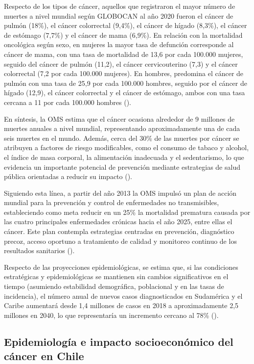 Respecto de los tipos de cáncer, aquellos que registraron el mayor número de muertes a nivel mundial según GLOBOCAN al año 2020 fueron el cáncer de pulmón (18\%), el cáncer colorrectal (9,4\%), el cáncer de hígado (8,3\%), el cáncer de estómago (7,7\%) y el cáncer de mama (6,9\%). En relación con la mortalidad oncológica según sexo, en mujeres la mayor tasa de defunción corresponde al cáncer de mama, con una tasa de mortalidad de 13,6 por cada 100.000 mujeres, seguido del cáncer de pulmón (11,2), el cáncer cervicouterino (7,3) y el cáncer colorrectal (7,2 por cada 100.000 mujeres). En hombres, predomina el cáncer de pulmón con una tasa de 25,9 por cada 100.000 hombres, seguido por el cáncer de hígado (12,9), el cáncer colorrectal y el cáncer de estómago, ambos con una tasa cercana a 11 por cada 100.000 hombres (\cite{minsal2022}).

En síntesis, la OMS estima que el cáncer ocasiona alrededor de 9 millones de muertes anuales a nivel mundial, representando aproximadamente una de cada seis muertes en el mundo. Además, cerca del 30\% de las muertes por cáncer se atribuyen a factores de riesgo modificables, como el consumo de tabaco y alcohol, el índice de masa corporal, la alimentación inadecuada y el sedentarismo, lo que evidencia un importante potencial de prevención mediante estrategias de salud pública orientadas a reducir su impacto (\cite{minsal2022}).

Siguiendo esta línea, a partir del año 2013 la OMS impulsó un plan de acción mundial para la prevención y control de enfermedades no transmisibles, estableciendo como meta reducir en un 25\% la mortalidad prematura causada por las cuatro principales enfermedades crónicas hacia el año 2025, entre ellas el cáncer. Este plan contempla estrategias centradas en prevención, diagnóstico precoz, acceso oportuno a tratamiento de calidad y monitoreo continuo de los resultados sanitarios (\cite{minsal2022}).

Respecto de las proyecciones epidemiológicas, se estima que, si las condiciones estratégicas y epidemiológicas se mantienen sin cambios significativos en el tiempo (asumiendo estabilidad demográfica, poblacional y en las tasas de incidencia), el número anual de nuevos casos diagnosticados en Sudamérica y el Caribe aumentará desde 1,4 millones de casos en 2018 a aproximadamente 2,5 millones en 2040, lo que representaría un incremento cercano al 78\% (\cite{minsal2022}).

\subsection{Epidemiología e impacto socioeconómico del cáncer en Chile}

